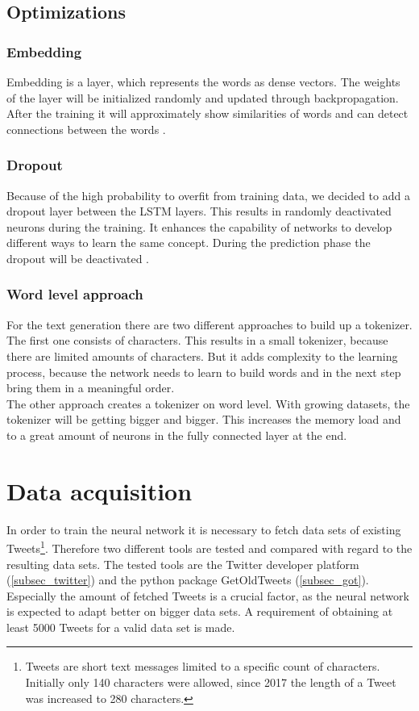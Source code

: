 \documentclass[conference]{IEEEtran}
\begin{document}
\subsection{Optimizations}

\subsubsection{Embedding}

Embedding is a layer, which represents the words as dense vectors. The weights of the layer will be initialized randomly and updated through backpropagation. After the training it will approximately show similarities of words and can detect connections between the words \cite{tim4}.

\subsubsection{Dropout}

Because of the high probability to overfit from training data, we decided to add a dropout layer between the LSTM layers. This results in randomly deactivated neurons during the training. It enhances the capability of networks to develop different ways to learn the same concept. During the prediction phase the dropout will be deactivated \cite{tim5}.

\subsubsection{Word level approach}

For the text generation there are two different approaches to build up a tokenizer. The first one consists of characters. This results in a small tokenizer, because there are limited amounts of characters. But it adds complexity to the learning process, because the network needs to learn to build words and in the next step bring them in a meaningful order.\\
The other approach creates a tokenizer on word level. With growing datasets, the tokenizer will be getting bigger and bigger. This increases the memory load and to a great amount of neurons in the fully connected layer at the end.

\section{Data acquisition}

In order to train the neural network it is necessary to fetch data sets of existing Tweets\footnote{Tweets are short text messages limited to a specific count of characters. Initially only 140 characters were allowed, since 2017 the length of a Tweet was increased to 280 characters.}. Therefore two different tools are tested and compared with regard to the resulting data sets. The tested tools are the Twitter developer platform \cite{twidev} (\ref{subsec_twitter}) and the python package GetOldTweets \cite{got} (\ref{subsec_got}). Especially the amount of fetched Tweets  is a crucial factor, as the neural network is expected to adapt better on bigger data sets. A requirement of obtaining at least 5000 Tweets for a valid data set is made.\\
\end{document}

